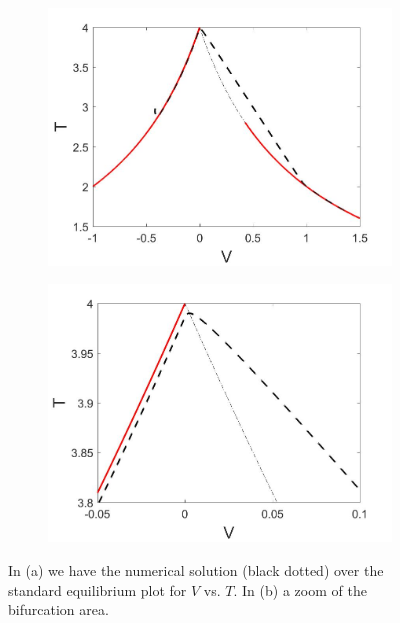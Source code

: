 \begin{figure}[H]
\centering
\begin{subfigure}{.5\textwidth}
  \centering
  \includegraphics[width=\linewidth]{twoD/slow_bif_Tplot.jpg}
  \caption{}
\end{subfigure}%
\begin{subfigure}{.5\textwidth}
  \centering
  \includegraphics[width=\linewidth]{twoD/slow_bif_Tplot_zoom.jpg}
  \caption{}
\end{subfigure}
\caption{In (a) we have the numerical solution (black dotted) over the standard equilibrium plot for $V$ vs. $T$. In (b) a zoom of the bifurcation area.}
\label{fig:twoD_slow_Tnumerics}
\end{figure}

